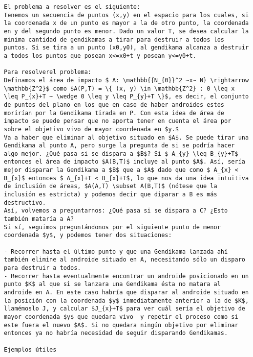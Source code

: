 \documentclass[10pt,a4paper]{article}
\begin{document}
\begin{verbatim}
El problema a resolver es el siguiente:
Tenemos un secuencia de puntos (x,y) en el espacio para los cuales, si la coordenada x de un punto es mayor a la de otro punto, la coordenada en y del segundo punto es menor. Dado un valor T, se desea calcular la minima cantidad de gendikamas a tirar para destruir a todos los puntos. Si se tira a un punto (x0,y0), al gendikama alcanza a destruir a todos los puntos que posean x<=x0+t y posean y<=y0+t.

Para resolverel problema:
Definamos el área de impacto $ A: \mathbb{{N_{0}}^2 ~x~ N} \rightarrow \mathbb{Z^2}$ como $A(P,T) = \{ (x, y) \in \mathbb{Z^2} : 0 \leq x \leq P_{x}+T ~ \wedge 0 \leq y \leq P_{y}+T \}$, es decir, el conjunto de puntos del plano en los que en caso de haber androides estos morirían por la Gendikama tirada en P. Con esta idea de área de impacto se puede pensar que no aporta tener en cuenta el área por sobre el objetivo vivo de mayor coordenada en $y.$
Va a haber que eliminar al objetivo situado en $A$. Se puede tirar una Gendikama al punto A, pero surge la pregunta de si se podría hacer algo mejor. ¿Qué pasa si se dispara a $B$? Si $ A_{y} \leq B_{y}+T$ entonces el área de impacto $A(B,T)$ incluye al punto $A$. Así, sería mejor disparar la Gendikama a $B$ que a $A$ dado que como $ A_{x} < B_{x}$ entonces $ A_{x}+T < B_{x}+T$, lo que nos da una idea intuitiva de inclusión de áreas, $A(A,T) \subset A(B,T)$ (nótese que la inclusión es estricta) y podemos decir que diparar a B es más destructivo.
Así, volvemos a preguntarnos: ¿Qué pasa si se dispara a C? ¿Esto también mataría a A?
Si sí, seguimos preguntándonos por el siguiente punto de menor coordenada $y$, y podemos tener dos situaciones:

- Recorrer hasta el último punto y que una Gendikama lanzada ahí también elimine al androide situado en A, necesitando sólo un disparo para destruir a todos.
- Recorrer hasta eventualmente encontrar un androide posicionado en un punto $K$ al que si se lanzara una Gendikama ésta no matara al androide en A. En este caso habría que disparar al androide situado en la posición con la coordenada $y$ inmediatamente anterior a la de $K$, llamémoslo J, y calcular $J_{x}+T$ para ver cuál sería el objetivo de mayor coordenada $y$ que quedara vivo  y repetir el proceso como si este fuera el nuevo $A$. Si no quedara ningún objetivo por eliminar entonces ya no habría necesidad de seguir disparando Gendikamas.

Ejemplos útiles


\end{verbatim}
\end{document}
